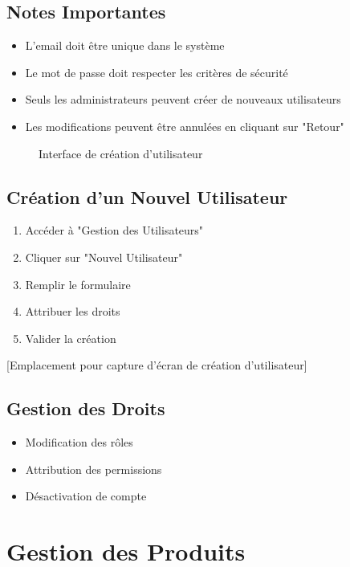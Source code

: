\documentclass[14pt,a4paper]{report}
\begin{document}
\subsection{Notes Importantes}
\begin{itemize}
    \item L'email doit être unique dans le système
    \item Le mot de passe doit respecter les critères de sécurité
    \item Seuls les administrateurs peuvent créer de nouveaux utilisateurs
    \item Les modifications peuvent être annulées en cliquant sur "Retour"
\end{itemize}

\begin{figure}[H]
    \centering
    \caption{Interface de création d'utilisateur}
\end{figure}

\subsection{Création d'un Nouvel Utilisateur}
\begin{enumerate}
    \item Accéder à "Gestion des Utilisateurs"
    \item Cliquer sur "Nouvel Utilisateur"
    \item Remplir le formulaire
    \item Attribuer les droits
    \item Valider la création
\end{enumerate}

[Emplacement pour capture d'écran de création d'utilisateur]

\subsection{Gestion des Droits}
\begin{itemize}
    \item Modification des rôles
    \item Attribution des permissions
    \item Désactivation de compte
\end{itemize}

\section{Gestion des Produits}
\end{document}
